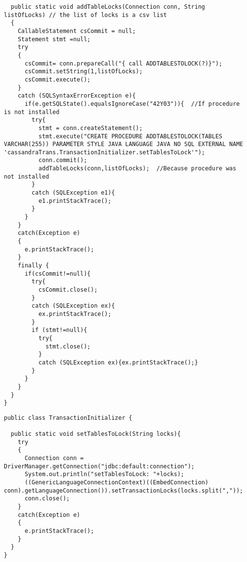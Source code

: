 \begin{shaded}
\begin{lstlisting}
  public static void addTableLocks(Connection conn, String listOfLocks) // the list of locks is a csv list
  { 
    CallableStatement csCommit = null;
    Statement stmt =null;
    try
    {
      csCommit= conn.prepareCall("{ call ADDTABLESTOLOCK(?)}");
      csCommit.setString(1,listOfLocks);
      csCommit.execute();
    }
    catch (SQLSyntaxErrorException e){
      if(e.getSQLState().equalsIgnoreCase("42Y03")){  //If procedure is not installed
        try{
          stmt = conn.createStatement();
          stmt.execute("CREATE PROCEDURE ADDTABLESTOLOCK(TABLES VARCHAR(255)) PARAMETER STYLE JAVA LANGUAGE JAVA NO SQL EXTERNAL NAME 'cassandraTrans.TransactionInitializer.setTablesToLock'");
          conn.commit();
          addTableLocks(conn,listOfLocks);  //Because procedure was not installed
        }
        catch (SQLException e1){
          e1.printStackTrace();
        }
      }
    }
    catch(Exception e)
    {
      e.printStackTrace();
    }
    finally {
      if(csCommit!=null){
        try{
          csCommit.close();
        }
        catch (SQLException ex){
          ex.printStackTrace();
        }
        if (stmt!=null){
          try{
            stmt.close();
          }
          catch (SQLException ex){ex.printStackTrace();}
        }
      }
    }
  }
}
\end{lstlisting}  
\end{shaded}



\lstset{
  language=Java, 
  caption=Server Side, 
  label=lst:server_trans,
}


\begin{shaded}
\begin{lstlisting}
public class TransactionInitializer {

  public static void setTablesToLock(String locks){
    try
    {
      Connection conn = DriverManager.getConnection("jdbc:default:connection");
      System.out.println("setTablesToLock: "+locks);
      ((GenericLanguageConnectionContext)((EmbedConnection) conn).getLanguageConnection()).setTransactionLocks(locks.split(","));
      conn.close();
    }
    catch(Exception e)
    {
      e.printStackTrace();
    }
  }
}	
\end{lstlisting}  
\end{shaded}
	